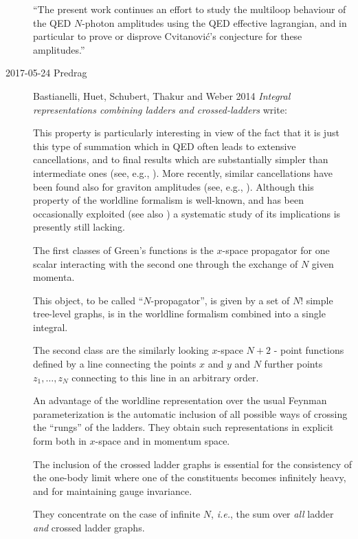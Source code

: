 \begin{description}
``The present work continues an
effort to study the multiloop
behaviour of the QED $N$-photon amplitudes using the QED effective
lagrangian, and in particular to prove or disprove Cvitanovi\'c's
conjecture for these amplitudes.''

\item[2017-05-24 Predrag]
Bastianelli, Huet, Schubert, Thakur and Weber 2014
{\em Integral representations combining ladders and crossed-ladders}
write:

This property is particularly interesting in view of the fact that it is
just this type of summation which in QED often leads to extensive
cancellations, and to final results which are substantially simpler than
intermediate ones (see, e.g., ). More recently, similar
cancellations have been found also for graviton amplitudes (see, e.g.,
).
Although this property of the worldline formalism is well-known, and has
been occasionally exploited (see also
) a systematic study of its implications is
presently still lacking.

The first classes of Green's functions %
is the
$x$-space propagator for one scalar interacting with the second one
through the exchange of $N$ given momenta.

This object, to be called ``$N$-propagator'', is given by a set of $N!$
simple tree-level graphs, is in the worldline formalism combined into a
single integral.

The second class are the similarly looking  $x$-space $N+2$ - point
functions %
defined by a line connecting
the points $x$ and $y$ and $N$ further points $z_1,\ldots,z_N$ connecting
to this line in an arbitrary order.

An advantage of the worldline representation over the usual Feynman
parameterization is the automatic inclusion of all possible ways of
crossing the ``rungs'' of the ladders. They obtain such representations
in explicit form both in $x$-space and in momentum space.

The inclusion of the crossed ladder graphs is essential for the
consistency of the one-body limit where one of the constituents becomes
infinitely heavy, and for maintaining gauge invariance.

They concentrate on the case of infinite $N$, \hbox{\it i.e.}, the sum
over {\it all} ladder {\it and} crossed ladder graphs.


\end{description}
